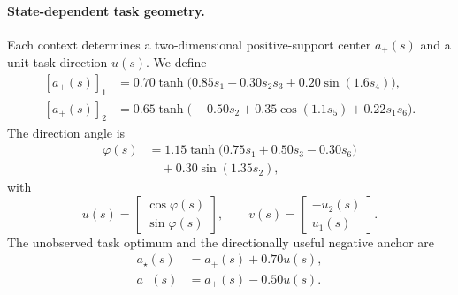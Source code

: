 \documentclass{article}
\theoremstyle{plain}
\theoremstyle{definition}
\theoremstyle{remark}
\begin{document}
\paragraph{State-dependent task geometry.}
Each context determines a two-dimensional positive-support center
$a_+(s)$ and a unit task direction $u(s)$. We define
\begin{equation}
\begin{aligned}
    [a_+(s)]_1
    &=
    0.70
    \tanh
    \bigl(
        0.85s_1
        -
        0.30s_2s_3
        +
        0.20\sin(1.6s_4)
    \bigr), \\
    [a_+(s)]_2
    &=
    0.65
    \tanh
    \bigl(
        -0.50s_2
        +
        0.35\cos(1.1s_5)
        +
        0.22s_1s_6
    \bigr).
\end{aligned}
\label{eq:cu1_positive_center}
\end{equation}
The direction angle is
\begin{equation}
\begin{aligned}
    \varphi(s)
    &=
    1.15
    \tanh
    \bigl(
        0.75s_1
        +
        0.50s_3
        -
        0.30s_6
    \bigr) \\
    &\quad+
    0.30\sin(1.35s_2),
\end{aligned}
\label{eq:cu1_direction_angle}
\end{equation}
with
\begin{equation}
    u(s)
    =
    \begin{bmatrix}
        \cos\varphi(s)\\
        \sin\varphi(s)
    \end{bmatrix},
    \qquad
    v(s)
    =
    \begin{bmatrix}
        -u_2(s)\\
        u_1(s)
    \end{bmatrix}.
    \label{eq:cu1_task_basis}
\end{equation}
The unobserved task optimum and the directionally useful negative anchor
are
\begin{equation}
\begin{aligned}
    a_\star(s)
    &=
    a_+(s)+0.70u(s), \\
    a_-(s)
    &=
    a_+(s)-0.50u(s).
\end{aligned}
\label{eq:cu1_task_points}
\end{equation}
\end{document}
